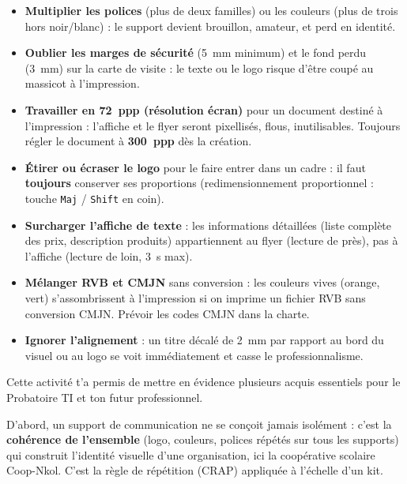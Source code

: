 \documentclass[11pt]{article}
\newcommand{\cle}[1]{{\popxbold\color{popdark}#1}}
\newcounter{popsec}
\newcounter{popsub}
\newcommand{\courssub}[1]{%
  \stepcounter{popsub}%
  \par\vspace{9pt}\noindent{\popxbold\fontsize{11.5}{13}\selectfont\color{popink}{\color{poporange}\thepopsec.\thepopsub}\hspace{6pt}#1}\par\nopagebreak\vspace{4pt}
}
\begin{document}
\begin{attention}
\begin{itemize}
  \item \textbf{Multiplier les polices} (plus de deux familles) ou les couleurs (plus de trois hors noir/blanc) : le support devient brouillon, amateur, et perd en identité.
  \item \textbf{Oublier les marges de sécurité} (5~mm minimum) et le fond perdu (3~mm) sur la carte de visite : le texte ou le logo risque d'être coupé au massicot à l'impression.
  \item \textbf{Travailler en 72~ppp (résolution écran)} pour un document destiné à l'impression : l'affiche et le flyer seront pixellisés, flous, inutilisables. Toujours régler le document à \textbf{300~ppp} dès la création.
  \item \textbf{Étirer ou écraser le logo} pour le faire entrer dans un cadre : il faut \textbf{toujours} conserver ses proportions (redimensionnement proportionnel : touche \texttt{Maj} / \texttt{Shift} en coin).
  \item \textbf{Surcharger l'affiche de texte} : les informations détaillées (liste complète des prix, description produits) appartiennent au flyer (lecture de près), pas à l'affiche (lecture de loin, 3~s max).
  \item \textbf{Mélanger RVB et CMJN} sans conversion : les couleurs vives (orange, vert) s'assombrissent à l'impression si on imprime un fichier RVB sans conversion CMJN. Prévoir les codes CMJN dans la charte.
  \item \textbf{Ignorer l'alignement} : un titre décalé de 2~mm par rapport au bord du visuel ou au logo se voit immédiatement et casse le professionnalisme.
\end{itemize}
\end{attention}

\courssub{Bilan de l'activité}

Cette activité t'a permis de mettre en évidence plusieurs acquis essentiels pour le Probatoire TI et ton futur professionnel.

D'abord, un support de communication ne se conçoit jamais isolément : c'est la \textbf{cohérence de l'ensemble} (logo, couleurs, polices répétés sur tous les supports) qui construit l'\cle{identité visuelle} d'une organisation, ici la coopérative scolaire Coop-Nkol. C'est la règle de \cle{répétition} (CRAP) appliquée à l'échelle d'un kit.
\end{document}
